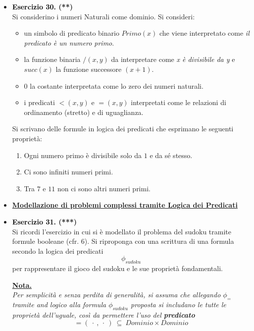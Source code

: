\documentclass[a4paper,10pt]{article}
\makeatletter
\newcommand{\EsercitazioneNum}{12}
\newcommand{\Data}{04/12/2025}
\newcommand{\DocType}{Esercitazione} %
\newcommand{\FullTitle}{\DocType\ \EsercitazioneNum}
\newcommand{\Header}{
\noindent
  \small \textbf{Computabilità, Complessità e Logica - a.a. 2025/26} \hfill \textbf{\FullTitle} \\[0.2cm]
  \scriptsize Matteo Liotta, \texttt{matteo.liotta@studenti.units.it} \hfill \Data \\[0.2cm]
  \noindent\makebox[\linewidth]{\rule{\linewidth}{0.4pt}} \\[0.3cm]}
\newcommand{\NewPageHeader}{
  \vfill
  \noindent\makebox[\linewidth]{\rule{\linewidth}{0.4pt}}
  \newpage
  {\Header}
}
\makeatother
\begin{document}
{\begin{itemize}[label=, leftmargin=0pt]
    \NewPageHeader
    
    \item \textbf{\textcolor{black}{Esercizio 30.} (**)}\\ 	
    Si considerino i numeri Naturali come dominio. Si consideri:
    
    \begin{itemize}
    \item un simbolo di predicato binario $Primo(x)$ che viene interpretato come \textit{il predicato è un numero primo}. 
    \item la funzione binaria $/(x, y)$ da interpretare come \textit{x è divisibile da y} e $succ(x)$ la funzione successore $(x+1)$. 
    \item $0$ la costante interpretata come lo zero dei numeri naturali. 
    \item i predicati $< (x, y)$ e $= (x, y)$ interpretati come le relazioni di ordinamento (stretto) e di uguaglianza. 
    \end{itemize}
    Si scrivano delle formule in logica dei predicati che esprimano le seguenti proprietà:
    \begin{enumerate}
        \item Ogni numero primo è divisibile solo da $1$ e da sé stesso.
        \item Ci sono infiniti numeri primi.
        \item Tra $7$ e $11$ non ci sono altri numeri primi.\\[0.1cm]
    
    \end{enumerate}


    \item \textbf{\underline{Modellazione di problemi complessi tramite Logica dei Predicati}}

    \item \textbf{\textcolor{black}{Esercizio 31.} (***)}\\ 	
    Si ricordi l'esercizio in cui si è modellato il problema del sudoku tramite formule booleane (cfr. 6). Si riproponga con una scrittura di una formula secondo la logica dei predicati $$\phi_{sudoku}$$ per rappresentare il gioco del sudoku e le sue proprietà fondamentali.\\
    
    \begin{osservazioni2}
    \underline{\textbf{Nota.}}\\
    \textit{Per semplicità e senza perdita di generalità, si assuma che allegando $\phi_=$ tramite and logico alla formula $\phi_{sudoku}$ proposta si includano le tutte le proprietà dell'uguale, così da permettere l'uso del \textbf{predicato} $$=(\ \cdot\ ,\ \cdot\ )\ \subseteq \ Dominio\times Dominio$$}
    \end{osservazioni2}


\end{itemize}}
\end{document}
